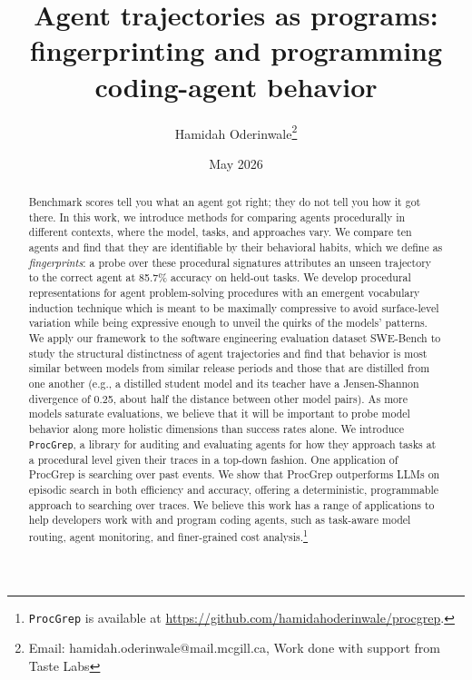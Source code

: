 \documentclass[11pt]{article}
\title{Agent trajectories as programs: fingerprinting and programming coding-agent behavior}
\author{Hamidah Oderinwale\thanks{Email: hamidah.oderinwale@mail.mcgill.ca, Work done with support from Taste Labs}}
\date{May 2026}
\begin{document}
  \maketitle

\begin{abstract}
Benchmark scores tell you what an agent got right; they do not tell you how it got there. In this work, we introduce methods for
  comparing agents procedurally in different contexts, where the model, tasks, and approaches vary. We compare ten agents and
  find that they are identifiable by their behavioral habits, which we define as \emph{fingerprints}: a probe over these
  procedural signatures attributes an unseen trajectory to the correct agent at 85.7\% accuracy on held-out tasks.
  We develop procedural representations for agent problem-solving procedures with an emergent vocabulary induction technique which
  is meant to be maximally compressive to avoid surface-level variation while being expressive enough to unveil the quirks of the
  models' patterns. We apply our framework to the software engineering evaluation dataset SWE-Bench to study the structural
  distinctness of agent trajectories and find that behavior is most similar between models from similar release periods and those
  that are distilled from one another (e.g., a distilled student model and its teacher have a Jensen-Shannon divergence of 0.25, about half the distance between other model pairs). As more models saturate evaluations, we believe that it will be important to probe
  model behavior along more holistic dimensions than success rates alone. We introduce \texttt{ProcGrep}, a library for auditing and
  evaluating agents for how they approach tasks at a procedural level given their traces in a top-down fashion. One application of ProcGrep is searching over past events. We show that ProcGrep outperforms LLMs on episodic search in both efficiency and accuracy, offering a deterministic, programmable approach to searching over traces. We believe this
  work has a range of applications to help developers work with and program coding agents, such as task-aware model routing, agent
  monitoring, and finer-grained cost analysis.\footnote{\texttt{ProcGrep} is available at
  \url{https://github.com/hamidahoderinwale/procgrep}.}
\end{abstract}


\end{document}
